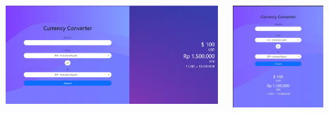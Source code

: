 \documentclass[aspectratio=169, table]{beamer}
\begin{document}

\begin{frame3}
    \vskip1cm
    \begin{tcolorbox}[standard jigsaw, opacityback=0, opacityframe=0, sharp corners, boxrule=0pt]
        \begin{columns}[T] %
            \begin{column}{0.5\textwidth}	
                \begin{center}
                	\includegraphics[width=1\textwidth]{classFiles/responsive-currency-converter.jpg}
		\end{center}
            \end{column}
            \begin{column}{0.5\textwidth}
		\begin{center}
                	\includegraphics[width=0.7\textwidth]{classFiles/responsive-currency-converter-mobile.jpg}
		\end{center}
            \end{column}
        \end{columns}
    \end{tcolorbox}
\end{frame3}
\end{document}
